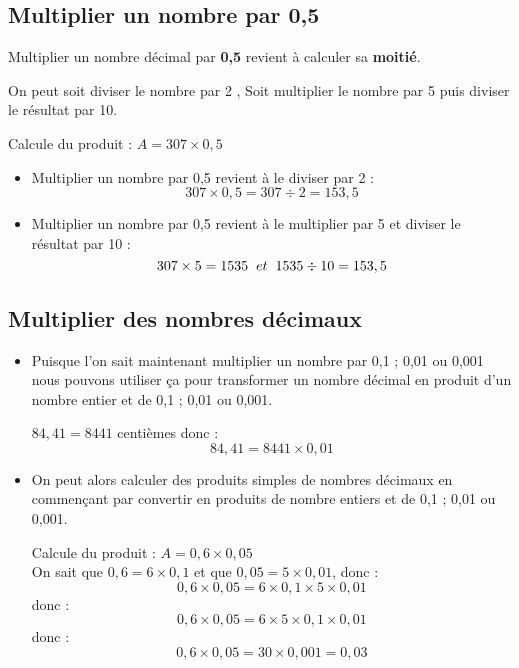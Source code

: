 \documentclass[a4paper,dvipsnames]{article}
\begin{document}
\subsection{Multiplier un nombre par 0,5}

\begin{Mt}
Multiplier un nombre décimal par \textbf{0,5} revient à calculer sa \textbf{moitié}.

On peut soit diviser le nombre par 2 , Soit multiplier le nombre par 5 puis diviser le résultat par 10.
\end{Mt}

\begin{Ex}
Calcule du produit : $A=307\times0,5$
\begin{itemize}
\item Multiplier un nombre par 0,5 revient à le diviser par 2 :
\[307\times0,5=307\div 2=153,5\]
\item Multiplier un nombre par 0,5 revient à le multiplier par 5 et diviser le résultat par 10 :
\[307\times5=1535\hspace{.2cm}et\hspace{.2cm}1535\div10=153,5\]
\end{itemize}
\end{Ex}

\subsection{Multiplier des nombres décimaux}

\begin{Mt}
\begin{itemize}
\item Puisque l'on sait maintenant multiplier un nombre par 0,1 ; 0,01 ou 0,001 nous pouvons utiliser ça pour transformer un nombre décimal en produit d'un nombre entier et de 0,1 ; 0,01 ou 0,001.

\begin{Ex}
$84,41=8441$ centièmes donc :
\[84,41=8441\times0,01\]
\end{Ex}
\item On peut alors calculer des produits simples de nombres décimaux en commençant par convertir en produits de nombre entiers et de 0,1 ; 0,01 ou 0,001.
\begin{Ex}
Calcule du produit : $A=0,6\times0,05$\\
On sait que $0,6=6\times0,1$ et que $0,05=5\times0,01$, donc :
\[0,6\times0,05=6\times0,1\times5\times0,01\]
donc :
\[0,6\times0,05=6\times5\times0,1\times0,01\]
donc :
\[0,6\times0,05=30\times0,001=0,03\]
\end{Ex}
\end{itemize}
\end{Mt}
\end{document}
